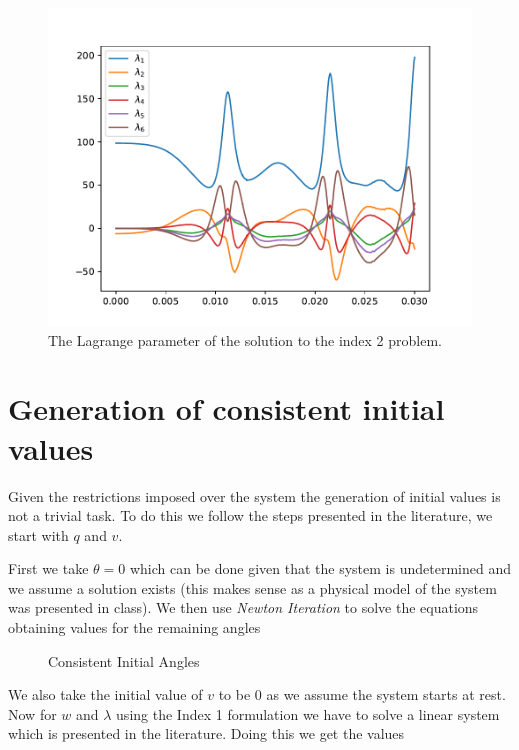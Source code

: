 \documentclass{report}
\begin{document}
\begin{figure}[h]
\centering
\begin{minipage}[b]{0.45\textwidth}
\centering
\includegraphics[width=\textwidth]{../Plots/Project2_main/Figure_512}
\caption{The Lagrange parameter of the solution to the index 2 problem.}
\label{pl:indx3_soln_lambdas}
\end{minipage}
\end{figure}

\section*{Generation of consistent initial values}

Given the restrictions imposed over the system the generation of initial values is not a trivial task. To do this we follow the steps presented in the literature, we start with $q$ and $v$.

First we take $\theta=0$ which can be done given that the system is undetermined and we assume a solution exists (this makes sense as a physical model of the system was presented in class). We then use \textit{Newton Iteration} to solve the equations obtaining values for the remaining angles

\begin{figure}[h]
\centering

\caption{Consistent Initial Angles}
\end{figure}

We also take the initial value of $v$ to be $0$ as we assume the system starts at rest. Now for $w$ and $\lambda$ using the Index 1 formulation we have to solve a linear system which is presented in the literature. Doing this we get the values
\end{document}
